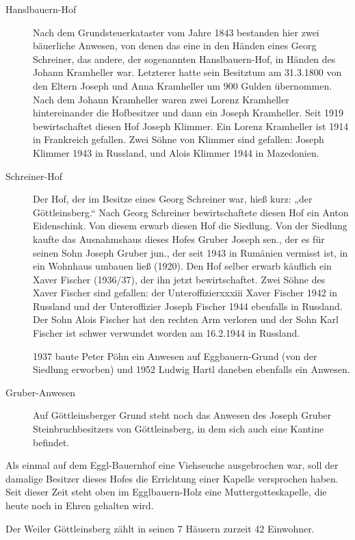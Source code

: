 \documentclass{book}
\begin{document}
\begin{description}
\item[Hanslbauern-Hof] Nach dem Grundsteuerkataster vom Jahre 1843 bestanden
hier zwei bäuerliche Anwesen, von denen das eine in den Händen eines Georg
Schreiner, das andere, der sogenannten Hanslbauern-Hof, in Händen des Johann
Kramheller war. Letzterer hatte sein Besitztum am 31.3.1800 von den Eltern
Joseph und Anna Kramheller um 900 Gulden übernommen. Nach dem Johann Kramheller
waren zwei Lorenz Kramheller hintereinander die Hofbesitzer und dann ein Joseph
Kramheller. Seit 1919 bewirtschaftet diesen Hof Joseph Klimmer. Ein Lorenz
Kramheller ist 1914 in Frankreich gefallen. Zwei Söhne von Klimmer sind
gefallen: Joseph Klimmer 1943 in Russland, und Alois Klimmer 1944 in Mazedonien.

\item[Schreiner-Hof] Der Hof, der im Besitze eines Georg Schreiner war, hieß
kurz: „der Göttleinsberg.“ Nach Georg Schreiner bewirtschaftete diesen Hof ein
Anton Eidenschink. Von diesem erwarb diesen Hof die Siedlung. Von der Siedlung
kaufte das Ausnahmshaus dieses Hofes Gruber Joseph sen., der es für seinen Sohn
Joseph Gruber jun., der seit 1943 in Rumänien vermisst ist, in ein Wohnhaus
umbauen ließ (1920). Den Hof selber erwarb käuflich ein Xaver Fischer (1936/37),
der ihn jetzt bewirtschaftet. Zwei Söhne des Xaver Fischer sind gefallen: der
Unteroffizierxxxiii Xaver Fischer 1942 in Russland und der Unteroffizier Joseph
Fischer 1944 ebenfalls in Russland. Der Sohn Alois Fischer hat den rechten Arm
verloren und der Sohn Karl Fischer ist schwer verwundet worden am 16.2.1944 in
Russland.

1937 baute Peter Pöhn ein Anwesen auf Eggbauern-Grund (von der Siedlung
erworben) und 1952 Ludwig Hartl daneben ebenfalls ein Anwesen.

\item[Gruber-Anwesen] Auf Göttleinsberger Grund steht noch das Anwesen des
Joseph Gruber Steinbruchbesitzers von Göttleinsberg, in dem sich auch eine
Kantine befindet.
\end{description}

Als einmal auf dem Eggl-Bauernhof eine Viehseuche ausgebrochen war, soll der
damalige Besitzer dieses Hofes die Errichtung einer Kapelle versprochen haben.
Seit dieser Zeit steht oben im Egglbauern-Holz eine Muttergotteskapelle, die
heute noch in Ehren gehalten wird.

Der Weiler Göttleinsberg zählt in seinen 7 Häusern zurzeit 42 Einwohner.
\end{document}
